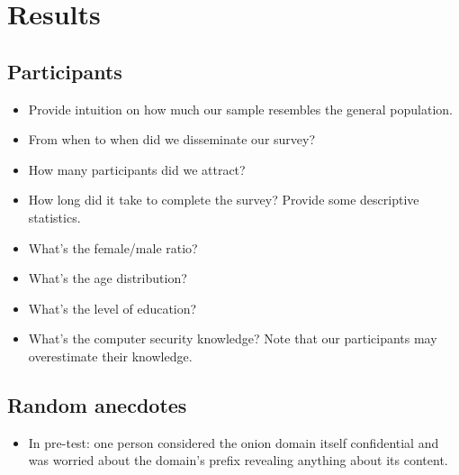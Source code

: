 \section{Results}
\label{sec:results}

\subsection{Participants}
\begin{itemize}
    \item Provide intuition on how much our sample resembles the general
        population.
    \item From when to when did we disseminate our survey?
    \item How many participants did we attract?
    \item How long did it take to complete the survey?  Provide some descriptive statistics.
    \item What's the female/male ratio?
    \item What's the age distribution?
    \item What's the level of education?
    \item What's the computer security knowledge?  Note that our participants
        may overestimate their knowledge.
\end{itemize}

\subsection{Random anecdotes}
\begin{itemize}
    \item In pre-test: one person considered the onion domain itself
        confidential and was worried about the domain's prefix revealing
        anything about its content.
\end{itemize}
